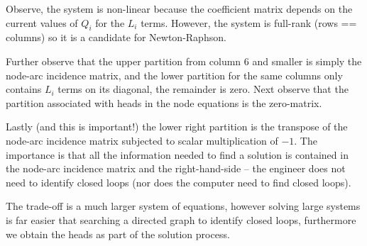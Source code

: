 Observe, the system is non-linear because the coefficient matrix depends on the current values of $Q_i$ for the $L_i$ terms. 
However, the system is full-rank (rows == columns) so it is a candidate for Newton-Raphson.

Further observe that the upper partition from column 6 and smaller is simply the node-arc incidence matrix, and the lower partition for the same columns only contains $L_i$ terms on its diagonal, the remainder is zero.   
Next observe that the partition associated with heads in the node equations is the zero-matrix.

Lastly (and this is important!) the lower right partition is the transpose of the node-arc incidence matrix subjected to scalar multiplication of $-1$.
The importance is that all the information needed to find a solution is contained in the node-arc incidence matrix and the right-hand-side -- the engineer does not need to identify closed loops (nor does the computer need to find closed loops). 

The trade-off is a much larger system of equations, however solving large systems is far easier that searching a directed graph to identify closed loops, furthermore we obtain the heads as part of the solution process.


